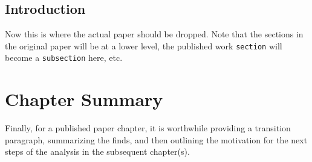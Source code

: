 \par
\subsection{Introduction}\label{sec:example_paper_intro}
Now this is where the actual paper should be dropped. Note that the sections in the original paper will be at a lower level, \ie the published work \texttt{section} will become a \texttt{subsection} here, etc.


\clearpage
\section{Chapter Summary}
Finally, for a published paper chapter, it is worthwhile providing a transition paragraph, summarizing the finds, and then outlining the motivation for the next steps of the analysis in the subsequent chapter(s).
